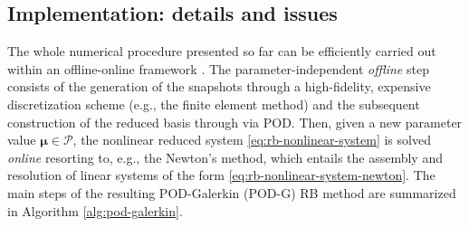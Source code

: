 \documentclass[12pt, a4paper, twoside, openright]{report}
\numberwithin{equation}{chapter}
\theoremstyle{theorem}
\theoremstyle{definition}
\theoremstyle{remark}
\theoremstyle{proposition}
\numberwithin{figure}{chapter}
\newcommand{\bg}[1]{\boldsymbol{#1}}
\begin{document}
	\subsection{Implementation: details and issues}
	\label{section:Implementation}
	
		The whole numerical procedure presented so far can be efficiently carried out within an offline-online framework \cite{Pru02}. The parameter-independent \emph{offline} step consists of the generation of the snapshots through a high-fidelity, expensive discretization scheme (e.g., the finite element method) and the subsequent construction of the reduced basis through via POD. Then, given a new parameter value $\bg{\mu} \in \mathcal{P}$, the nonlinear reduced system \eqref{eq:rb-nonlinear-system} is solved \emph{online} resorting to, e.g., the Newton's method, which entails the assembly and resolution of linear systems of the form \eqref{eq:rb-nonlinear-system-newton}. The main steps of the resulting POD-Galerkin (POD-G) RB method are summarized in Algorithm \ref{alg:pod-galerkin}.
		
		\algrenewcommand\textproc{}
		
\end{document}
